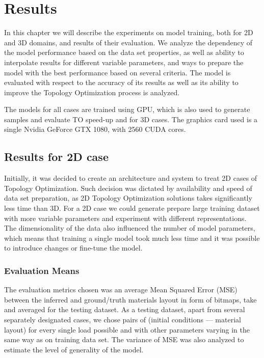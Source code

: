 
\chapter{Results}
\label{chapter:Results}

In this chapter we will describe the experiments on model training, both for 2D and 3D domains, and results of their evaluation.
We analyze the dependency of the model performance based on the data set properties, as well as ability to interpolate results for different variable parameters, and ways to prepare the model with the best performance based on several criteria. 
The model is evaluated with respect to the accuracy of its results as well as  its ability to improve the Topology Optimization process is analyzed.

The models for all cases are trained using GPU, which is also used to generate samples and evaluate TO speed-up and for 3D cases.
The graphics card used is a single Nvidia GeForce GTX 1080, with 2560 CUDA cores. 

\section{Results for 2D case}

Initially, it was decided to create an architecture and system to treat 2D cases of Topology Optimization.
Such decision was dictated by availability and speed of data set preparation, as 2D Topology Optimization solutions takes significantly less time than 3D. 
For a 2D case we could generate prepare large training dataset with more variable parameters and experiment with different representations.
The dimensionality of the data also influenced the number of model parameters, which means that training a single model took much less time and it was possible to introduce changes or fine-tune the model.


\subsection{Evaluation Means}

The evaluation metrics chosen was an average Mean Squared Error (MSE) between the inferred and ground/truth materials layout in form of bitmaps, take and averaged for the testing dataset. 
As a testing dataset, apart from several separately designated cases, we chose pairs of (initial conditions --- material layout) for every single load possible and with other parameters varying in the same way as on training data set.
The variance of MSE was also analyzed to estimate the level of generality of the model.

